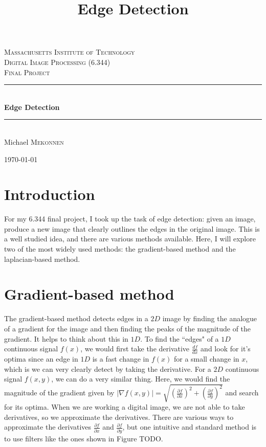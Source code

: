 \documentclass[12pt]{amsart}
\title{Edge Detection}
\newcommand{\HRule}{\rule{\linewidth}{0.5mm}}
\begin{document}
\begin{titlepage}
\begin{center}

\textsc{\LARGE Massachusetts Institute of Technology}\\[1.5cm]

\textsc{\Large Digital Image Processing (6.344) \\ Final Project}\\[0.5cm]

\HRule \\[0.4cm]
{ \huge \bfseries Edge Detection}\\[0.4cm]
\HRule \\[1.5cm]

\large Michael \textsc{Mekonnen}

\vfill

{\large \today}

\end{center}
\end{titlepage}

\maketitle

\section{Introduction}

For my 6.344 final project, I took up the task of edge detection: given an image, produce a new image that clearly outlines the edges in the original image. This is a well studied idea, and there are various methods available. Here, I will explore two of the most widely used methods: the gradient-based method and the laplacian-based method.

\section{Gradient-based method}

The gradient-based method detects edges in a $2D$ image by finding the analogue of a gradient for the image and then finding the peaks of the magnitude of the gradient. It helps to think about this in $1D$. To find the ``edges" of a $1D$ continuous signal $f(x)$, we would first take the derivative $\frac{df}{dx}$ and look for it's optima since an edge in $1D$ is a fast change in $f(x)$ for a small change in $x$, which is we can very clearly detect by taking the derivative. For a $2D$ continuous signal $f(x,y)$, we can do a very similar thing. Here, we would find the magnitude of the gradient given by $|\nabla f(x,y)| = \sqrt{(\frac{\partial f}{\partial x})^2 + (\frac{\partial f}{\partial y})^2}$ and search for its optima. When we are working a digital image, we are not able to take derivatives, so we approximate the derivatives. There are various ways to approximate the derivatives $\frac{\partial f}{\partial x}$ and $\frac{\partial f}{\partial y}$, but one intuitive and standard method is to use filters like the ones shown in Figure TODO.
\end{document}
